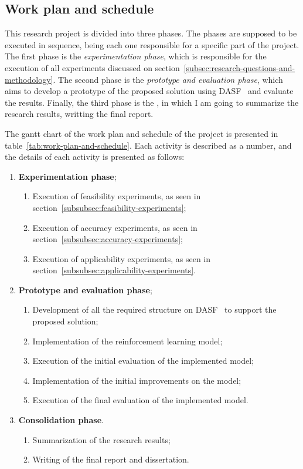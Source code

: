 \subsection{Work plan and schedule}
\label{subsec:work-plan-and-schedule}

This research project is divided into three phases.
The phases are supposed to be executed in sequence, being each one responsible for a specific part of the project.
The first phase is the \emph{experimentation phase}, which is responsible for the execution of all experiments discussed on section~\ref{subsec:research-questions-and-methodology}.
The second phase is the \emph{prototype and evaluation phase}, which aims to develop a prototype of the proposed solution using \ac{DASF}~\cite{dasf} and evaluate the results.
Finally, the third phase is the , in which I am going to summarize the research results, writting the final report.

The gantt chart of the work plan and schedule of the project is presented in table~\ref{tab:work-plan-and-schedule}.
Each activity is described as a number, and the details of each activity is presented as follows:

\begin{enumerate}
  \item \textbf{Experimentation phase};
    \begin{enumerate}
      \item Execution of feasibility experiments, as seen in section~\ref{subsubsec:feasibility-experiments};
      \item Execution of accuracy experiments, as seen in section~\ref{subsubsec:accuracy-experiments};
      \item Execution of applicability experiments, as seen in section~\ref{subsubsec:applicability-experiments}.
    \end{enumerate}
  \item \textbf{Prototype and evaluation phase};
    \begin{enumerate}
      \item Development of all the required structure on \ac{DASF}~\cite{dasf} to support the proposed solution;
      \item Implementation of the reinforcement learning model;
      \item Execution of the initial evaluation of the implemented model;
      \item Implementation of the initial improvements on the model;
      \item Execution of the final evaluation of the implemented model.
    \end{enumerate}
  \item \textbf{Consolidation phase}.
    \begin{enumerate}
      \item Summarization of the research results;
      \item Writing of the final report and dissertation.
    \end{enumerate}
\end{enumerate}

